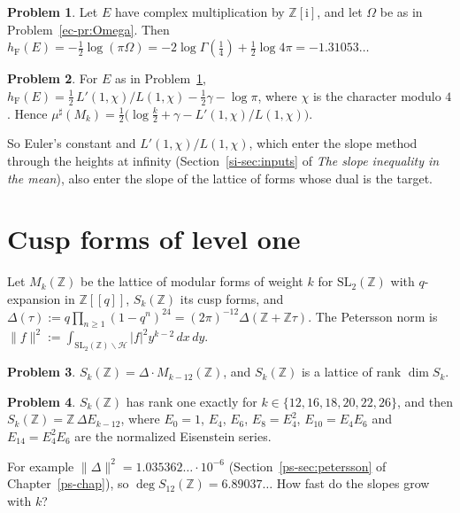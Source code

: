 \documentclass[reqno]{amsart}
\newcounter{chap}
\theoremstyle{definition}
\newtheorem{problem}{Problem}[section]
\theoremstyle{plain}
\newcommand{\Z}{\mathbb{Z}}
\newcommand{\Hc}{\mathcal{H}}
\newcommand{\ii}{\mathrm{i}}
\newcommand{\hF}{h_{\mathrm{F}}}
\begin{document}
\begin{problem}\label{pr:hF-i}
Let \(E\) have complex multiplication by \(\Z[\ii]\), and let \(\Omega\) be as in Problem~\ref{ec-pr:Omega}.  Then \(\hF(E) = -\tfrac12\log(\pi\Omega) = -2\log\Gamma(\tfrac14) + \tfrac12\log 4\pi = -1.31053\ldots\)
\end{problem}

\begin{problem}\label{pr:hF-CS}
For \(E\) as in Problem~\ref{pr:hF-i}, \(\hF(E) = \tfrac12\, L'(1,\chi)/L(1,\chi) - \tfrac12\gamma - \log\pi\), where \(\chi\) is the character modulo \(4\).  Hence \(\mu^\sharp(M_k) = \tfrac12\bigl(\log\tfrac{k}{2} + \gamma - L'(1,\chi)/L(1,\chi)\bigr)\).
\end{problem}

So Euler's constant and \(L'(1,\chi)/L(1,\chi)\), which enter the slope method through the heights at infinity (Section~\ref{si-sec:inputs} of \emph{The slope inequality in the mean}), also enter the slope of the lattice of forms whose dual is the target.

\section{Cusp forms of level one}\label{sec:modular}

Let \(M_k(\Z)\) be the lattice of modular forms of weight \(k\) for \(\mathrm{SL}_2(\Z)\) with \(q\)-expansion in \(\Z[[q]]\), \(S_k(\Z)\) its cusp forms, and \(\Delta(\tau) := q\prod_{n \ge 1}(1-q^n)^{24} = (2\pi)^{-12}\Delta(\Z + \Z\tau)\).  The Petersson norm is \(\lVert f \rVert^2 := \int_{\mathrm{SL}_2(\Z)\backslash\Hc} \lvert f \rvert^2 y^{k-2} \, dx\,dy\).

\begin{problem}\label{pr:Sk}
\(S_k(\Z) = \Delta\cdot M_{k-12}(\Z)\), and \(S_k(\Z)\) is a lattice of rank \(\dim S_k\).
\end{problem}

\begin{problem}\label{pr:Sk-one}
\(S_k(\Z)\) has rank one exactly for \(k \in \{12, 16, 18, 20, 22, 26\}\), and then \(S_k(\Z) = \Z\,\Delta E_{k-12}\), where \(E_0 = 1\), \(E_4\), \(E_6\), \(E_8 = E_4^2\), \(E_{10} = E_4E_6\) and \(E_{14} = E_4^2E_6\) are the normalized Eisenstein series.
\end{problem}

For example \(\lVert\Delta\rVert^2 = 1.035362\ldots \cdot 10^{-6}\) (Section~\ref{ps-sec:petersson} of Chapter~\ref{ps-chap}), so \(\deg S_{12}(\Z) = 6.89037\ldots\)  How fast do the slopes grow with \(k\)?
\end{document}
